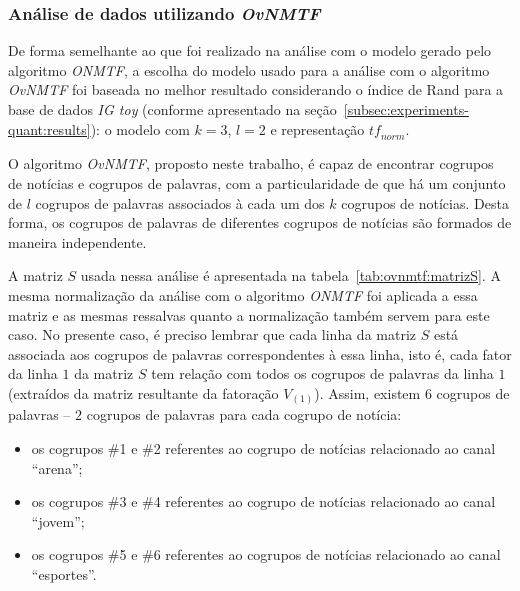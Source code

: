 \documentclass[
    12pt,                %
    oneside,            %
    a4paper,            %
    english,            %
    brazil                %
    ]{abntex2ppgsi}
\begin{document}
\subsubsection{Análise de dados utilizando \textit{OvNMTF}}

De forma semelhante ao que foi realizado na análise com o modelo gerado pelo algoritmo \textit{ONMTF}, a escolha do modelo usado para a análise com o algoritmo \textit{OvNMTF} foi baseada no melhor resultado considerando o índice de Rand para a base de dados \textit{IG toy} (conforme apresentado na seção~\ref{subsec:experiments-quant:results}): o modelo com $k = 3$, $l = 2$ e representação $\textit{tf}_{norm}$.

O algoritmo \textit{OvNMTF}, proposto neste trabalho, é capaz de encontrar cogrupos de notícias e cogrupos de palavras, com a particularidade de que há um conjunto de $l$ cogrupos de palavras associados à cada um dos $k$ cogrupos de notícias. Desta forma, os cogrupos de palavras de diferentes cogrupos de notícias são formados de maneira independente.


A matriz $S$ usada nessa análise é apresentada na tabela~\ref{tab:ovnmtf:matrizS}.
A mesma normalização da análise com o algoritmo \textit{ONMTF} foi aplicada a essa matriz e as mesmas ressalvas quanto a normalização também servem para este caso. No presente caso, é preciso lembrar que cada linha da matriz $S$ está associada aos cogrupos de palavras correspondentes à essa linha, isto é, cada fator da linha $1$ da matriz $S$ tem relação com todos os cogrupos de palavras da linha $1$ (extraídos da matriz resultante da fatoração $V_{(1)}$). Assim, existem $6$ cogrupos de palavras -- $2$ cogrupos de palavras para cada cogrupo de notícia:

\begin{itemize}
\item os cogrupos \#1 e \#2 referentes ao cogrupo de notícias relacionado ao canal ``arena'';
\item os cogrupos \#3 e \#4 referentes ao cogrupo de notícias relacionado ao canal ``jovem'';
\item os cogrupos \#5 e \#6 referentes ao cogrupos de notícias relacionado ao canal ``esportes''.
\end{itemize}
\end{document}
